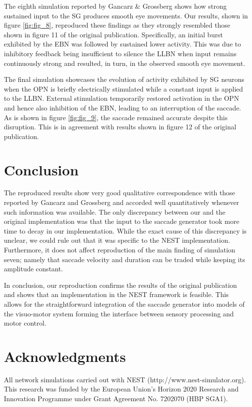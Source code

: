 \documentclass[10pt,a4paper,onecolumn]{article}
\begin{document}
The eighth simulation reported by Gancarz \& Grossberg
\autocite{Gancarz1998} shows how strong sustained input to the SG
produces smooth eye movements. Our results, shown in figure
\ref{fig:fig_8}, reproduced these findings as they strongly resembled
those shown in figure 11 of the original publication. Specifically, an
initial burst exhibited by the EBN was followed by sustained lower
activity. This was due to inhibitory feedback being insufficient to
silence the LLBN when input remains continuously strong and resulted, in
turn, in the observed smooth eye movement.

The final simulation showcases the evolution of activity exhibited by SG
neurons when the OPN is briefly electrically stimulated while a constant
input is applied to the LLBN. External stimulation temporarily restored
activation in the OPN and hence also inhibition of the EBN, leading to
an interruption of the saccade. As is shown in figure \ref{fig:fig_9},
the saccade remained accurate despite this disruption. This is in
agreement with results shown in figure 12 of the original publication.

\section{Conclusion}\label{conclusion}

The reproduced results show very good qualitative correspondence with
those reported by Gancarz and Grossberg \autocite{Gancarz1998} and
accorded well quantitatively whenever such information was available.
The only discrepancy between our and the original implementation was
that the input to the saccade generator took more time to decay in our
implementation. While the exact cause of this discrepancy is unclear, we
could rule out that it was specific to the NEST implementation.
Furthermore, it does not affect reproduction of the main finding of
simulation seven; namely that saccade velocity and duration can be
traded while keeping its amplitude constant.

In conclusion, our reproduction confirms the results of the original
publication and shows that an implementation in the NEST framework is
feasible. This allows for the straightforward integration of the saccade
generator into models of the visuo-motor system forming the interface
between sensory processing and motor control.

\section{Acknowledgments}\label{acknowledgments}

All network simulations carried out with NEST
(http://www.nest-simulator.org). This research was funded by the
European Union's Horizon 2020 Research and Innovation Programme under
Grant Agreement No. 7202070 (HBP SGA1).

{\sffamily \small
  \printbibliography[title=References]
}
\end{document}
